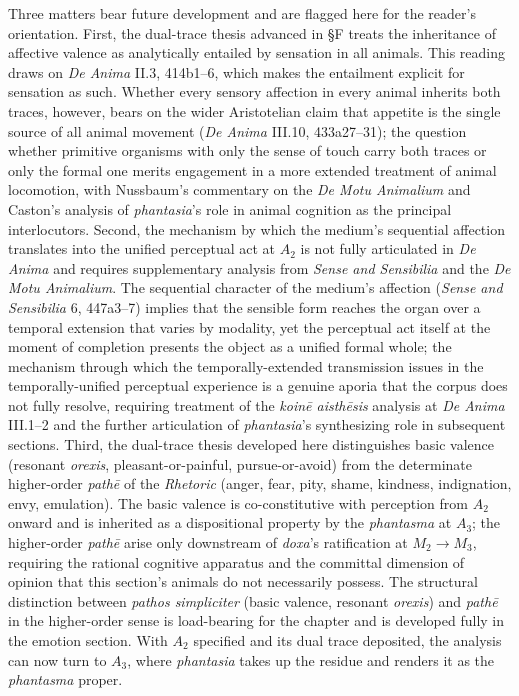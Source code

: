 Three matters bear future development and are flagged here for the reader's orientation. First, the dual-trace thesis advanced in §F treats the inheritance of affective valence as analytically entailed by sensation in all animals. This reading draws on \textit{De Anima} II.3, 414b1--6, which makes the entailment explicit for sensation as such. Whether every sensory affection in every animal inherits both traces, however, bears on the wider Aristotelian claim that appetite is the single source of all animal movement (\textit{De Anima} III.10, 433a27--31); the question whether primitive organisms with only the sense of touch carry both traces or only the formal one merits engagement in a more extended treatment of animal locomotion, with Nussbaum's commentary on the \textit{De Motu Animalium} and Caston's analysis of \textit{phantasia}'s role in animal cognition as the principal interlocutors. Second, the mechanism by which the medium's sequential affection translates into the unified perceptual act at $A_2$ is not fully articulated in \textit{De Anima} and requires supplementary analysis from \textit{Sense and Sensibilia} and the \textit{De Motu Animalium}. The sequential character of the medium's affection (\textit{Sense and Sensibilia} 6, 447a3--7) implies that the sensible form reaches the organ over a temporal extension that varies by modality, yet the perceptual act itself at the moment of completion presents the object as a unified formal whole; the mechanism through which the temporally-extended transmission issues in the temporally-unified perceptual experience is a genuine aporia that the corpus does not fully resolve, requiring treatment of the \textit{koinē aisthēsis} analysis at \textit{De Anima} III.1--2 and the further articulation of \textit{phantasia}'s synthesizing role in subsequent sections. Third, the dual-trace thesis developed here distinguishes basic valence (resonant \textit{orexis}, pleasant-or-painful, pursue-or-avoid) from the determinate higher-order \textit{pathē} of the \textit{Rhetoric} (anger, fear, pity, shame, kindness, indignation, envy, emulation). The basic valence is co-constitutive with perception from $A_2$ onward and is inherited as a dispositional property by the \textit{phantasma} at $A_3$; the higher-order \textit{pathē} arise only downstream of \textit{doxa}'s ratification at $M_2 \rightarrow M_3$, requiring the rational cognitive apparatus and the committal dimension of opinion that this section's animals do not necessarily possess. The structural distinction between \textit{pathos simpliciter} (basic valence, resonant \textit{orexis}) and \textit{pathē} in the higher-order sense is load-bearing for the chapter and is developed fully in the emotion section. With $A_2$ specified and its dual trace deposited, the analysis can now turn to $A_3$, where \textit{phantasia} takes up the residue and renders it as the \textit{phantasma} proper.
